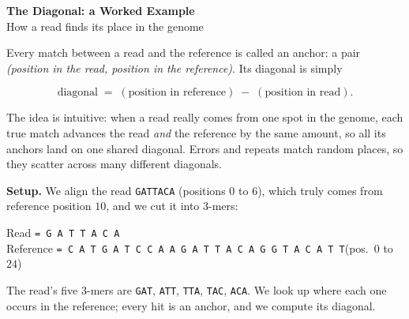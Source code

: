 \documentclass[11pt]{article}
\begin{document}
\pagestyle{empty}

\begin{center}
{\Large\bfseries The Diagonal: a Worked Example}\\[2pt]
{\small How a read finds its place in the genome}
\end{center}

Every match between a read and the reference is called an anchor: a pair
\emph{(position in the read, position in the reference)}. Its diagonal is simply

\[
\text{diagonal} \;=\; (\text{position in reference}) \;-\; (\text{position in read}).
\]

The idea is intuitive: when a read really comes from one spot in the genome, each true match
advances the read \emph{and} the reference by the same amount, so all its anchors land on
one shared diagonal. Errors and repeats match random places, so they scatter across
many different diagonals.

\textbf{Setup.} We align the read \texttt{GATTACA} (positions $0$ to $6$), which truly comes from
reference position $10$, and we cut it into $3$-mers:

\begin{center}
\small
Read \texttt{= G A T T A C A}\\[3pt]
Reference \texttt{= C A T G A T C C A A G A T T A C A G G T A C A T T}\quad(pos.\ $0$ to $24$)
\end{center}

The read's five $3$-mers are \texttt{GAT}, \texttt{ATT}, \texttt{TTA}, \texttt{TAC}, \texttt{ACA}.
We look up where each one occurs in the reference; every hit is an anchor, and we compute its diagonal.
\end{document}
